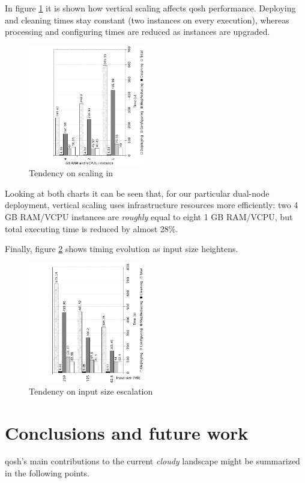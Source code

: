 \documentclass[conference]{IEEEtran}
\begin{document}
In figure \ref{fig:scalein} it is shown how vertical scaling affects qosh performance. Deploying and cleaning times stay constant (two instances on every execution), whereas processing and configuring times are reduced as instances are upgraded.

\begin{figure}[htp]
\centering
\includegraphics[width=0.45\textwidth]{img/008}
\caption{Tendency on scaling in}
\label{fig:scalein}
\end{figure}

Looking at both charts it can be seen that, for our particular dual-node deployment, vertical scaling uses infrastructure resources more efficiently: two 4 GB RAM/VCPU instances are \emph{roughly} equal to eight 1 GB RAM/VCPU, but total executing time is reduced by almost 28\%.

Finally, figure \ref{fig:inputscale} shows timing evolution as input size heightens.

\begin{figure}[htp]
\centering
\includegraphics[width=0.45\textwidth]{img/009}
\caption{Tendency on input size escalation}
\label{fig:inputscale}
\end{figure}



\section{Conclusions and future work}\label{sec:conclusions}
\noindent qosh's main contributions to the current \emph{cloudy} landscape might be summarized in the following points.
\end{document}
